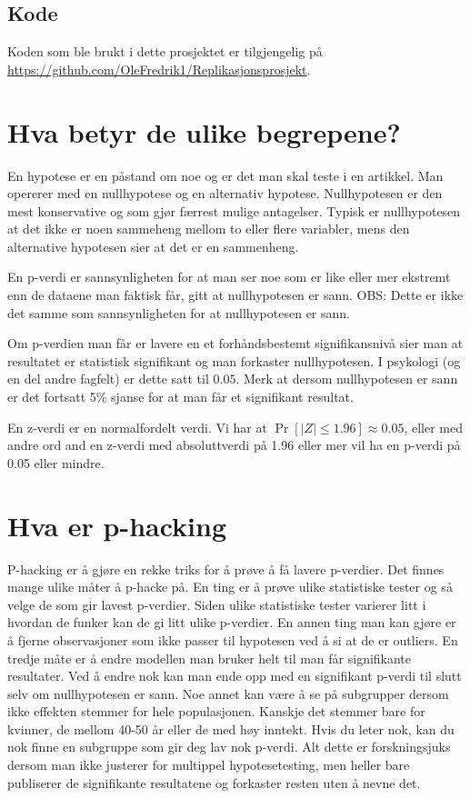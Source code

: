 \documentclass[doc,norsk]{apa7}
\begin{document}
\subsection{Kode}
Koden som ble brukt i dette prosjektet er tilgjengelig på \url{https://github.com/OleFredrik1/Replikasjonsprosjekt}.

\section{Hva betyr de ulike begrepene?}
En hypotese er en påstand om noe og er det man skal teste i en artikkel. Man opererer med en nullhypotese og en alternativ hypotese. Nullhypotesen er den mest konservative og som gjør færrest mulige antagelser. Typisk er nullhypotesen at det ikke er noen sammeheng mellom to eller flere variabler, mens den alternative hypotesen sier at det er en sammenheng.

En p-verdi er sannsynligheten for at man ser noe som er like eller mer ekstremt enn de dataene man faktisk får, gitt at nullhypotesen er sann. OBS: Dette er ikke det samme som sannsynligheten for at nullhypotesen er sann.

Om p-verdien man får er lavere en et forhåndsbestemt signifikansnivå sier man at resultatet er statistisk signifikant og man forkaster nullhypotesen. I psykologi (og en del andre fagfelt) er dette satt til $0.05$. Merk at dersom nullhypotesen er sann er det fortsatt 5\% sjanse for at man får et signifikant resultat.

En z-verdi er en normalfordelt verdi. Vi har at $\Pr[|Z| \leq 1.96] \approx 0.05$, eller med andre ord and en z-verdi med absoluttverdi på 1.96 eller mer vil ha en p-verdi på 0.05 eller mindre.

\section{Hva er p-hacking}
P-hacking er å gjøre en rekke triks for å prøve å få lavere p-verdier. Det finnes mange ulike måter å p-hacke på. En ting er å prøve ulike statistiske tester og så velge de som gir lavest p-verdier. Siden ulike statistiske tester varierer litt i hvordan de funker kan de gi litt ulike p-verdier. En annen ting man kan gjøre er å fjerne observasjoner som ikke passer til hypotesen ved å si at de er outliers. En tredje måte er å endre modellen man bruker helt til man får signifikante resultater. Ved å endre nok kan man ende opp med en signifikant p-verdi til slutt selv om nullhypotesen er sann. Noe annet kan være å se på subgrupper dersom ikke effekten stemmer for hele populasjonen. Kanskje det stemmer bare for kvinner, de mellom 40-50 år eller de med høy inntekt. Hvis du leter nok, kan du nok finne en subgruppe som gir deg lav nok p-verdi. Alt dette er forskningsjuks dersom man ikke justerer for multippel hypotesetesting, men heller bare publiserer de signifikante resultatene og forkaster resten uten å nevne det.
\end{document}
